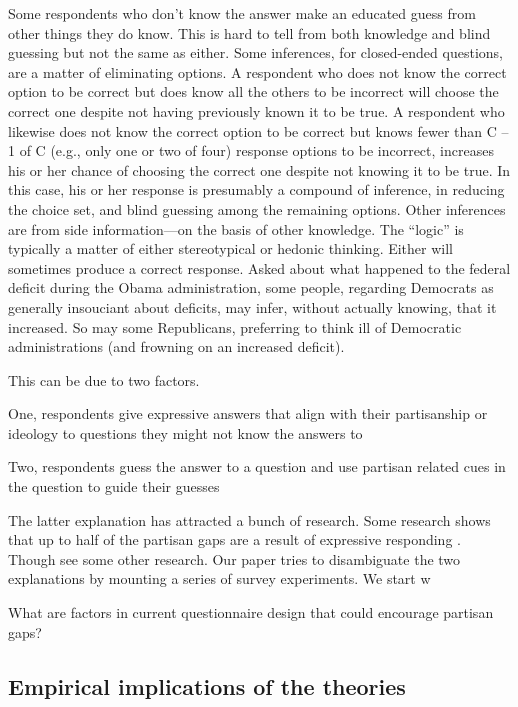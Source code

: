 \documentclass[12pt, letterpaper]{article}
\begin{document}
Some respondents who don’t know the answer make an educated guess from other things they do know.  This is hard to tell from both knowledge and blind guessing but not the same as either.  Some inferences, for closed-ended questions, are a matter of eliminating options.  A respondent who does not know the correct option to be correct but does know all the others to be incorrect will choose the correct one despite not having previously known it to be true.  A respondent who likewise does not know the correct option to be correct but knows fewer than C – 1 of C (e.g., only one or two of four) response options to be incorrect, increases his or her chance of choosing the correct one despite not knowing it to be true.  In this case, his or her response is presumably a compound of inference, in reducing the choice set, and blind guessing among the remaining options.  Other inferences are from side information—on the basis of other knowledge.  The “logic” is typically a matter of either stereotypical or hedonic thinking.  Either will sometimes produce a correct response.  Asked about what happened to the federal deficit during the Obama administration, some people, regarding Democrats as generally insouciant about deficits, may infer, without actually knowing, that it increased.  So may some Republicans, preferring to think ill of Democratic administrations (and frowning on an increased deficit). 

This can be due to two factors.

One, respondents give expressive answers that align with their partisanship or ideology to questions they might not know the answers to

Two, respondents guess the answer to a question and use partisan related cues in the question to guide their guesses

The latter explanation has attracted a bunch of research. Some research shows that up to half of the partisan gaps are a result of expressive responding \citep{prior, bullock}. Though see some other research. Our paper tries to disambiguate the two explanations by mounting a series of survey experiments. We start w


\citep{Zaller1992}

What are factors in current questionnaire design that could encourage partisan gaps?

\subsection*{Empirical implications of the theories}
\end{document}
